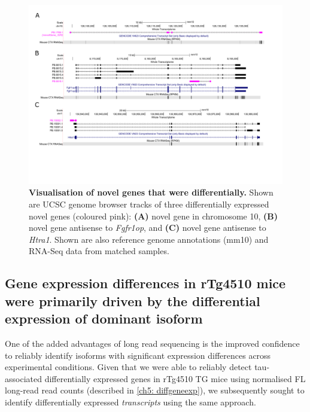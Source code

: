 \begin{landscape}
	\begin{figure}[!htp]
		\centering
		\includegraphics[page=1,trim={0 3.5cm 0 1cm}, scale = 0.80]{Figures/TracksFigures_Diff.pdf}
		\captionsetup{width=1.4\textwidth}
		\caption[Visualisation of differentially expressed novel genes]%
		{\textbf{Visualisation of novel genes that were differentially.} Shown are UCSC genome browser tracks of three differentially expressed novel genes (coloured pink): \textbf{(A)} novel gene in chromosome 10, \textbf{(B)} novel gene antisense to \textit{Fgfr1op}, and \textbf{(C)} novel gene antisense to \textit{Htra1}. Shown are also reference genome annotations (mm10) and RNA-Seq data from matched samples.}   
		\label{fig:whole_novelgene_difftracks}
	\end{figure}
\end{landscape}

\clearpage
\subsection{Gene expression differences in rTg4510 mice were primarily driven by the differential expression of dominant isoform}
One of the added advantages of long read sequencing is the improved confidence to reliably identify isoforms with significant expression differences across experimental conditions. Given that we were able to reliably detect tau-associated differentially expressed genes in rTg4510 TG mice using normalised FL long-read read counts (described in \cref{ch5: diffgeneexp}), we subsequently sought to identify differentially expressed \textit{transcripts} using the same approach. 

